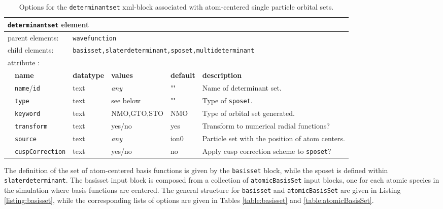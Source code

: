 \begin{table}[h]
\begin{center}
\begin{tabularx}{\textwidth}{l l l l l l }
\hline
\multicolumn{6}{l}{\texttt{determinantset} element} \\
\hline
\multicolumn{2}{l}{parent elements:} & \multicolumn{4}{l}{\texttt{wavefunction}}\\
\multicolumn{2}{l}{child  elements:} & \multicolumn{4}{l}{\texttt{basisset,slaterdeterminant,sposet,multideterminant}}\\
\multicolumn{2}{l}{attribute      :} & \multicolumn{4}{l}{}\\
   &   \bfseries name              & \bfseries datatype & \bfseries values & \bfseries default   & \bfseries description \\
   &   \texttt{name}/\texttt{id}   &  text              &  \textit{any}    &  ""             & Name of determinant set. \\
   &   \texttt{type}                    &  text               &   see below   &   ""            &  Type of \texttt{sposet}. \\
   &   \texttt{keyword}             &  text               &   NMO,GTO,STO   &  NMO        & Type of orbital set generated. \\  
   &   \texttt{transform}           &  text               &   yes/no          &  yes         &  Transform to numerical radial functions?  \\
   &   \texttt{source}               &  text               &   \textit{any}    &  ion0        & Particle set with the position of atom centers. \\
   &   \texttt{cuspCorrection}  &  text               &   yes/no          &  no         & Apply cusp correction scheme to \texttt{sposet}? \\
  \hline
\end{tabularx}
\end{center}
\caption{Options for the \texttt{determinantset} xml-block associated with atom-centered single particle orbital sets.}
\label{table:determinantset}
\end{table}

The definition of the set of atom-centered basis functions is given by the \texttt{basisset} block, while the sposet is defined within \texttt{slaterdeterminant}. The basisset input block is composed from a collection of \texttt{atomicBasisSet} input blocks, one for each atomic species in the simulation where basis functions are centered. The general structure for \texttt{basisset} and \texttt{atomicBasisSet} are given in Listing \ref{listing:basisset}, while the corresponding lists of options are given in Tables \ref{table:basisset} and \ref{table:atomicBasisSet}.

